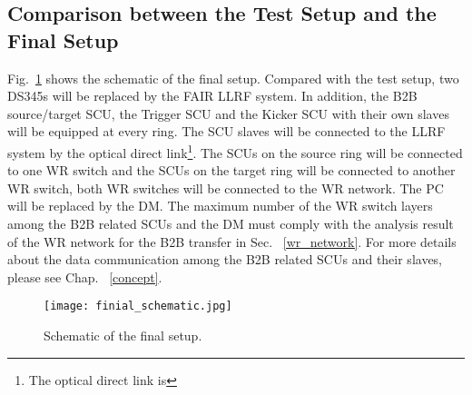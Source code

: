 \subsection{Comparison between the Test Setup and the Final Setup}
\label{sec:test_diff}
Fig.~\ref{finial_schematic} shows the schematic of the final setup. Compared with the test setup, two DS345s will be replaced by the FAIR LLRF system. In addition, the B2B source/target SCU, the Trigger SCU and the Kicker SCU with their own slaves will be equipped at every ring. The SCU slaves will be connected to the LLRF system by the optical direct link\footnote{The optical direct link is }. The SCUs on the source ring will be connected to one WR switch and the SCUs on the target ring will be connected to another WR switch, both WR switches will be connected to the WR network. The PC will be replaced by the DM. The maximum number of the WR switch layers among the B2B related SCUs and the DM must comply with the analysis result of the WR network for the B2B transfer in Sec. ~\ref{wr_network}. For more details about the data communication among the B2B related SCUs and their slaves, please see Chap. ~\ref{concept}.   

\begin{figure}[!htb]
   \centering   
   \texttt{[image: finial\_schematic.jpg]}
   \caption{Schematic of the final setup.}

   \label{finial_schematic}
\end{figure} 

